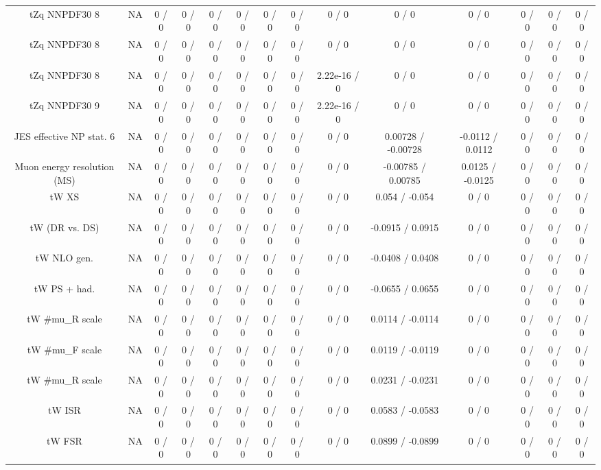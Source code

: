 \documentclass[10pt]{article}
\begin{document}
\begin{table}[htbp]
\begin{center}
\begin{tabular}{|c|c|c|c|c|c|c|c|c|c|c|c|c|c|}
  tZq NNPDF30 8 &    NA    & 0 / 0 & 0 / 0 & 0 / 0 & 0 / 0 & 0 / 0 & 0 / 0 & 0 / 0 & 0 / 0 & 0 / 0 & 0 / 0 & 0 / 0 & 0 / 0 \\ 
  tZq NNPDF30 8 &    NA    & 0 / 0 & 0 / 0 & 0 / 0 & 0 / 0 & 0 / 0 & 0 / 0 & 0 / 0 & 0 / 0 & 0 / 0 & 0 / 0 & 0 / 0 & 0 / 0 \\ 
  tZq NNPDF30 8 &    NA    & 0 / 0 & 0 / 0 & 0 / 0 & 0 / 0 & 0 / 0 & 0 / 0 & 2.22e-16 / 0 & 0 / 0 & 0 / 0 & 0 / 0 & 0 / 0 & 0 / 0 \\ 
  tZq NNPDF30 9 &    NA    & 0 / 0 & 0 / 0 & 0 / 0 & 0 / 0 & 0 / 0 & 0 / 0 & 2.22e-16 / 0 & 0 / 0 & 0 / 0 & 0 / 0 & 0 / 0 & 0 / 0 \\ 
  JES effective NP stat. 6 &    NA    & 0 / 0 & 0 / 0 & 0 / 0 & 0 / 0 & 0 / 0 & 0 / 0 & 0 / 0 & 0.00728 / -0.00728 & -0.0112 / 0.0112 & 0 / 0 & 0 / 0 & 0 / 0 \\ 
  Muon energy resolution (MS) &    NA    & 0 / 0 & 0 / 0 & 0 / 0 & 0 / 0 & 0 / 0 & 0 / 0 & 0 / 0 & -0.00785 / 0.00785 & 0.0125 / -0.0125 & 0 / 0 & 0 / 0 & 0 / 0 \\ 
  tW XS &    NA    & 0 / 0 & 0 / 0 & 0 / 0 & 0 / 0 & 0 / 0 & 0 / 0 & 0 / 0 & 0.054 / -0.054 & 0 / 0 & 0 / 0 & 0 / 0 & 0 / 0 \\ 
  tW (DR vs. DS) &    NA    & 0 / 0 & 0 / 0 & 0 / 0 & 0 / 0 & 0 / 0 & 0 / 0 & 0 / 0 & -0.0915 / 0.0915 & 0 / 0 & 0 / 0 & 0 / 0 & 0 / 0 \\ 
  tW NLO gen. &    NA    & 0 / 0 & 0 / 0 & 0 / 0 & 0 / 0 & 0 / 0 & 0 / 0 & 0 / 0 & -0.0408 / 0.0408 & 0 / 0 & 0 / 0 & 0 / 0 & 0 / 0 \\ 
  tW PS + had. &    NA    & 0 / 0 & 0 / 0 & 0 / 0 & 0 / 0 & 0 / 0 & 0 / 0 & 0 / 0 & -0.0655 / 0.0655 & 0 / 0 & 0 / 0 & 0 / 0 & 0 / 0 \\ 
  tW #mu_{R} scale &    NA    & 0 / 0 & 0 / 0 & 0 / 0 & 0 / 0 & 0 / 0 & 0 / 0 & 0 / 0 & 0.0114 / -0.0114 & 0 / 0 & 0 / 0 & 0 / 0 & 0 / 0 \\ 
  tW #mu_{F} scale &    NA    & 0 / 0 & 0 / 0 & 0 / 0 & 0 / 0 & 0 / 0 & 0 / 0 & 0 / 0 & 0.0119 / -0.0119 & 0 / 0 & 0 / 0 & 0 / 0 & 0 / 0 \\ 
  tW #mu_{R} scale &    NA    & 0 / 0 & 0 / 0 & 0 / 0 & 0 / 0 & 0 / 0 & 0 / 0 & 0 / 0 & 0.0231 / -0.0231 & 0 / 0 & 0 / 0 & 0 / 0 & 0 / 0 \\ 
  tW ISR &    NA    & 0 / 0 & 0 / 0 & 0 / 0 & 0 / 0 & 0 / 0 & 0 / 0 & 0 / 0 & 0.0583 / -0.0583 & 0 / 0 & 0 / 0 & 0 / 0 & 0 / 0 \\ 
  tW FSR &    NA    & 0 / 0 & 0 / 0 & 0 / 0 & 0 / 0 & 0 / 0 & 0 / 0 & 0 / 0 & 0.0899 / -0.0899 & 0 / 0 & 0 / 0 & 0 / 0 & 0 / 0 \\ 

\end{tabular}
\end{center}
\end{table}
\end{document}
